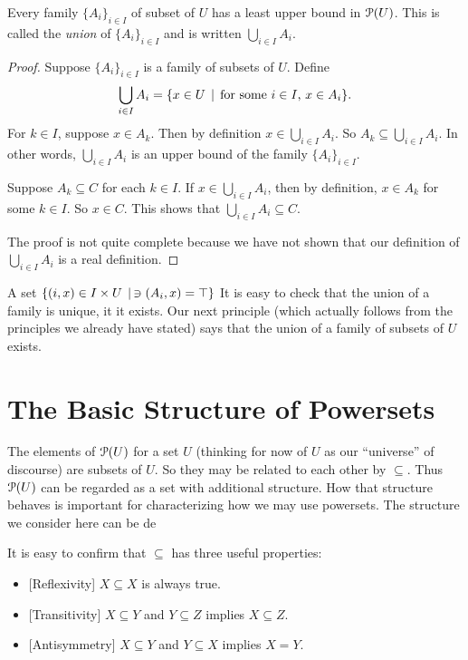\begin{lemma}
	Every family $\{A_i\}_{i\in I}$ of subset of $U$ has a least upper bound in ${\mathcal{P}}(U)$.
	This is called the \emph{union} of $\{A_i\}_{i\in I}$ and is written $\bigcup_{i\in I}A_i$.
	
	\begin{proof}
		Suppose $\{A_i\}_{i\in I}$ is a family of subsets of $U$. 
		Define 
		\[\bigcup_{i\in I}A_i = \{x\in U\,\mid\, \text{for some $i\in I$, $x\in A_i$}\}.\]
		For $k\in I$, suppose $x\in A_k$.
		Then by definition $x\in \bigcup_{i\in I}A_i$.
		So $A_k\subseteq \bigcup_{i\in I}A_i$.
		In other words, $\bigcup_{i\in I}A_i$ is an upper bound of the family $\{A_i\}_{i\in I}$.
		
		Suppose $A_k\subseteq C$ for each $k\in I$.
		If $x\in\bigcup_{i\in I}A_i$, then by definition, $x\in A_k$ for some $k\in I$.
		So $x\in C$.
		This shows that $\bigcup_{i\in I}A_i\subseteq C$.
		
		The proof is not quite complete because we have not shown that
		our definition of $\bigcup_{i\in I}A_i$ is a real definition.
 	\end{proof}
\end{lemma}

A set $\{(i,x)\in I\times U\,\mid\, \ni(A_i,x)=\top\}$
It is easy to check that the union of a family is unique, it it exists. Our next principle (which actually follows from the principles we already have stated)
says that the union of a family of subsets of $U$ exists.
 


\section{The Basic Structure of Powersets}

The elements of ${\mathcal{P}}(U)$ for a set $U$ (thinking for now of $U$ as our
``universe'' of discourse) are subsets of $U$.
So they may be related to each other by $\subseteq$. 
Thus ${\mathcal{P}}(U)$ can be regarded as a set with additional structure. 
How that structure behaves is important for characterizing how we may use powersets. The structure we consider here can be de

It is easy to confirm that $\subseteq$ has three useful properties:
\begin{itemize}
	\item{}[Reflexivity] $X\subseteq X$ is always true.
	\item{}[Transitivity] $X\subseteq Y$ and $Y\subseteq Z$ implies $X\subseteq Z$.
	\item{}[Antisymmetry] $X\subseteq Y$ and $Y\subseteq X$ implies $X=Y$.
\end{itemize}

